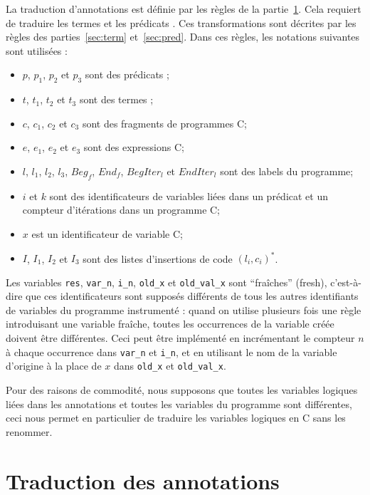 La traduction d'annotations est définie par les règles de la
partie~\ref{sec:annot}.
Cela requiert de traduire les termes et les prédicats \eacsl.
Ces transformations sont décrites par les règles des parties~\ref{sec:term}
et~\ref{sec:pred}.
Dans ces règles, les notations suivantes sont utilisées :
\begin{itemize}
\item $p$, $p_1$, $p_2$ et $p_3$ sont des prédicats \eacsl;
\item $t$, $t_1$, $t_2$ et $t_3$ sont des termes \eacsl;
\item $c$, $c_1$, $c_2$ et $c_3$ sont des fragments de programmes C;
\item $e$, $e_1$, $e_2$ et $e_3$ sont des expressions C;
\item $l$, $l_1$, $l_2$, $l_3$, $Beg_f$, $End_f$, $BegIter_l$ et $EndIter_l$ sont
  des labels du programme;
\item $i$ et $k$ sont des identificateurs de variables liées dans un prédicat
  \eacsl et un compteur d'itérations dans un programme C;
\item $x$ est un identificateur de variable C;
\item $I$, $I_1$, $I_2$ et $I_3$ sont des listes d'insertions de code
  $(l_i, c_i)^*$.
\end{itemize}

Les variables \lstinline'res', \lstinline'var_n', \lstinline'i_n',
\lstinline|old_x| et \lstinline'old_val_x' sont
``fraîches'' (fresh), c'est-à-dire que ces identificateurs sont supposés
différents de tous les autres identifiants de variables du programme instrumenté
: quand on utilise plusieurs fois une règle introduisant une variable fraîche,
toutes les occurrences de la variable créée doivent être différentes.
Ceci peut être implémenté en incrémentant le compteur $n$ à chaque occurrence
dans \lstinline'var_n' et \lstinline'i_n', et en utilisant le nom de la variable
d'origine à la place de $x$ dans \lstinline'old_x' et \lstinline'old_val_x'.

Pour des raisons de commodité, nous supposons que toutes les variables logiques
liées dans les annotations et toutes les variables du programme sont
différentes, ceci nous permet en particulier de traduire les variables logiques
en C sans les renommer.

\section{Traduction des annotations \eacsl}
\label{sec:annot}


